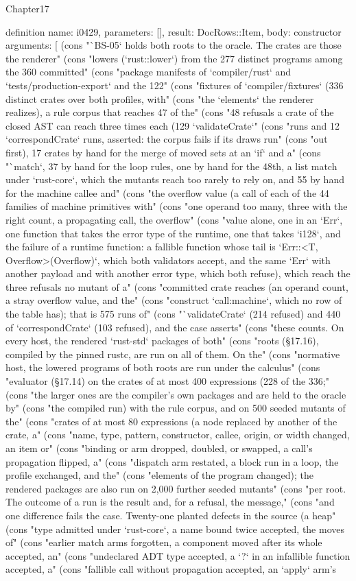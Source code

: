 \begin{lexlean}{Chapter17}
\begin{semanticmodule}
definition{
  name: i0429,
  parameters: [],
  result: DocRows::Item,
  body: constructor{
    arguments: [
      (cons "`BS-05` holds both roots to the oracle. The crates are those the renderer" (cons "lowers (`rust::lower`) from the 277 distinct programs among the 360 committed" (cons "package manifests of `compiler/rust` and `tests/production-export` and the 122" (cons "fixtures of `compiler/fixtures` (336 distinct crates over both profiles, with" (cons "the `elements` the renderer realizes), a rule corpus that reaches 47 of the" (cons "48 refusals a crate of the closed AST can reach three times each (129 `validateCrate`" (cons "runs and 12 `correspondCrate` runs, asserted: the corpus fails if its draws run" (cons "out first), 17 crates by hand for the merge of moved sets at an `if` and a" (cons "`match`, 37 by hand for the loop rules, one by hand for the 48th, a list match under `rust-core`, which the mutants reach too rarely to rely on, and 55 by hand for the machine callee and" (cons "the overflow value (a call of each of the 44 families of machine primitives with" (cons "one operand too many, three with the right count, a propagating call, the overflow" (cons "value alone, one in an `Err`, one function that takes the error type of the runtime, one that takes `i128`, and the failure of a runtime function: a fallible function whose tail is `Err::<T, Overflow>(Overflow)`, which both validators accept, and the same `Err` with another payload and with another error type, which both refuse), which reach the three refusals no mutant of a" (cons "committed crate reaches (an operand count, a stray overflow value, and the" (cons "construct `call:machine`, which no row of the table has); that is 575 runs of" (cons "`validateCrate` (214 refused) and 440 of `correspondCrate` (103 refused), and the case asserts" (cons "these counts. On every host, the rendered `rust-std` packages of both" (cons "roots (§17.16), compiled by the pinned rustc, are run on all of them. On the" (cons "normative host, the lowered programs of both roots are run under the calculus" (cons "evaluator (§17.14) on the crates of at most 400 expressions (228 of the 336;" (cons "the larger ones are the compiler's own packages and are held to the oracle by" (cons "the compiled run) with the rule corpus, and on 500 seeded mutants of the" (cons "crates of at most 80 expressions (a node replaced by another of the crate, a" (cons "name, type, pattern, constructor, callee, origin, or width changed, an item or" (cons "binding or arm dropped, doubled, or swapped, a call's propagation flipped, a" (cons "dispatch arm restated, a block run in a loop, the profile exchanged, and the" (cons "elements of the program changed); the rendered packages are also run on 2,000 further seeded mutants" (cons "per root. The outcome of a run is the result and, for a refusal, the message," (cons "and one difference fails the case. Twenty-one planted defects in the source (a heap" (cons "type admitted under `rust-core`, a name bound twice accepted, the moves of" (cons "earlier match arms forgotten, a component moved after its whole accepted, an" (cons "undeclared ADT type accepted, a `?` in an infallible function accepted, a" (cons "fallible call without propagation accepted, an `apply` arm's }}
\end{semanticmodule}
\end{lexlean}
